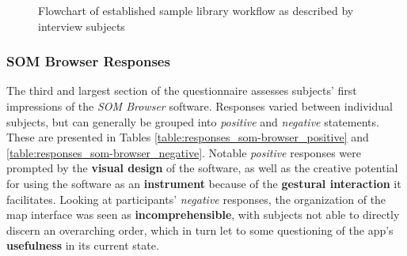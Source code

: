 \begin{figure}[!p]
\caption[Established sample library workflow]{Flowchart of established sample
library workflow as described by interview subjects}
\label{fig:results_current_workflow}
\end{figure}



\subsubsection{SOM Browser Responses}
\label{subsubsec:results_som-browser_responses}
The third and largest section of the questionnaire assesses subjects' first
impressions of the \textit{SOM Browser} software. Responses varied between
individual subjects, but can generally be grouped into \textit{positive} and
\textit{negative} statements. These are presented in Tables
\ref{table:responses_som-browser_positive} and
\ref{table:responses_som-browser_negative}. Notable \textit{positive} responses
were prompted by the \textbf{visual design} of the software, as well as the
creative potential for using the software as an \textbf{instrument} because of
the \textbf{gestural interaction} it facilitates. Looking at participants'
 \textit{negative} responses, the organization of the map interface was seen as
 \textbf{incomprehensible}, with subjects not able to directly discern an
 overarching order, which in turn let to some questioning of the app's
 \textbf{usefulness} in its current state.

\pagebreak

